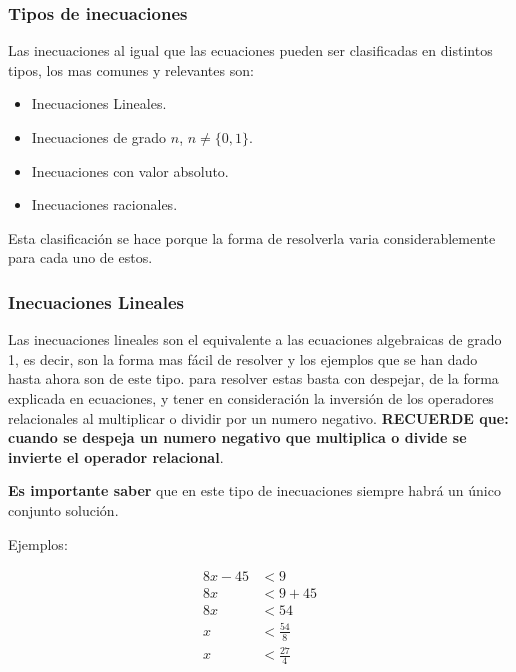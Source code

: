     \subsubsection{Tipos de inecuaciones} \label{Tipos-de-inecuaciones}

    Las inecuaciones al igual que las ecuaciones pueden ser clasificadas en
    distintos tipos, los mas comunes y relevantes son:

    \begin{itemize}
        \item Inecuaciones Lineales.
        \item Inecuaciones de grado $n$, $n \not = \{0,1\}$.
        \item Inecuaciones con valor absoluto.
        \item Inecuaciones racionales.
    \end{itemize}

    Esta clasificación se hace porque la forma de resolverla varia
    considerablemente para cada uno de estos.

    \subsubsection*{Inecuaciones Lineales} \label{Inecuaciones-Lineales}

    Las inecuaciones lineales son el equivalente a las ecuaciones algebraicas
    de grado 1, es decir, son la forma mas fácil de resolver y los ejemplos que
    se han dado hasta ahora son de este tipo. para resolver
    estas basta con despejar, de la forma explicada en \refname{ecuaciones},
    y tener en consideración la inversión de los operadores relacionales al
    multiplicar o dividir por un numero negativo. \textbf{RECUERDE que:}
    \textbf{cuando se despeja un numero negativo que multiplica
    o divide se invierte el operador relacional}.

    \textbf{Es importante saber } que en este tipo de inecuaciones siempre habrá
    un único conjunto solución.

    Ejemplos:

    \begin{align*}
        8x -45  &<9 		\\
        8x &< 9+45 \\
        8x & < 54\\
        x & < \frac{54}{8} \\
        x & < \frac{27}{4}
    \end{align*}

